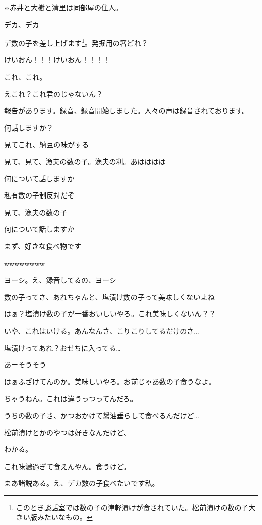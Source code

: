 ※赤井と大樹と清里は同部屋の住人。
\begin{multicols}{3}
デカ、デカ

デ数の子を差し上げます\footnote{このとき談話室では数の子の津軽漬けが食されていた。松前漬けの数の子大きい版みたいなもの。}。発掘用の箸どれ？

けいおん！！！けいおん！！！！

これ、これ。

えこれ？これ君のじゃないん？

報告があります。録音、録音開始しました。人々の声は録音されております。

何話しますか？

見てこれ、納豆の味がする

見て、見て、漁夫の数の子。漁夫の利。あはははは

何について話しますか

私有数の子制反対だぞ

見て、漁夫の数の子

何について話しますか

まず、好きな食べ物です

wwwwwwww

ヨーシ。え、録音してるの、ヨーシ

数の子ってさ、あれちゃんと、塩漬け数の子って美味しくないよね

はぁ？塩漬け数の子が一番おいしいやろ。これ美味しくないん？？

いや、これはいける。あんなんさ、こりこりしてるだけのさ…

塩漬けってあれ？おせちに入ってる…

あーそうそう

はぁふざけてんのか。美味しいやろ。お前じゃあ数の子食うなよ。

ちゃうねん。これは違うっつってんだろ。

うちの数の子さ、かつおかけて醤油垂らして食べるんだけど…

松前漬けとかのやつは好きなんだけど、

わかる。

これ味濃過ぎて食えんやん。食うけど。

まあ諸説ある。え、デカ数の子食べたいです私。


\end{multicols}
